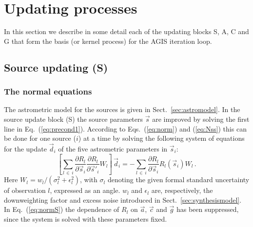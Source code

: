 \documentclass[structabstract]{aa}
\begin{document}
\section{Updating processes} \label{sec:blocks}

In this section we describe in some detail each of the updating blocks
S, A, C and G that form the basis (or kernel process) for the AGIS iteration loop.

\subsection{Source updating (S)} \label{sec:sourceupdate}

\subsubsection{The normal equations}\label{sec:source-normals}

The astrometric model for the sources is given in Sect.~\ref{sec:astromodel}.
In the source update block (S) the source parameters $\vec{s}$ are improved
by solving the first line in Eq.~(\ref{eq:precond1}). According to
Eqs.~(\ref{eq:norm}) and (\ref{eq:Nss}) this can be done for one source ($i$)
at a time by solving the following system of equations for the update
$\vec{d}_i$ of the five astrometric parameters in $\vec{s}_i$:
\begin{equation} \label{eq:normS}
\left[ \sum_{l\,\in\,i} \frac{\partial R_l}{\partial\vec{s}_i}
\frac{\partial R_l}{\partial\vec{s}'_{\!i}}W_l \right]\,\vec{d}_i
= -\sum_{l\,\in\,i} \frac{\partial R_l}{\partial\vec{s}_i}
R_l(\vec{s}_i)W_l \, .
\end{equation}
Here $W_l=w_l/(\sigma_l^2+\epsilon_l^2)$, with $\sigma_l$ denoting the given
formal standard uncertainty of observation $l$, expressed as an angle. $w_l$ and
$\epsilon_l$ are, respectively, the downweighting factor and excess noise
introduced in Sect.~\ref{sec:synthesismodel}. In Eq.~(\ref{eq:normS}) the 
dependence of $R_l$ on $\vec{a}$, $\vec{c}$ and $\vec{g}$ has been suppressed, 
since the system is solved with these parameters fixed.
\end{document}
